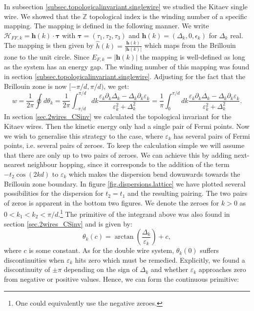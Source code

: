 In subsection \ref{subsec.topologicalinvariant.singlewire} we studied the Kitaev single wire. We showed that the $\mathbb{Z}$ topological index is the winding number of a specific mapping. The mapping is defined in the following manner. We write $\mathcal{H}_{FF,k} = \mathbf{h}(k)\cdot \boldsymbol\tau$ with $\boldsymbol\tau = (\tau_1, \tau_2, \tau_3)$ and $\mathbf{h}(k) = (\Delta_k, 0, \epsilon_k)$ for $\Delta_k$ real. The mapping is then given by $\hat{h}(k) = \frac{\mathbf{h}(k)}{|\mathbf{h}(k)|}$ which maps from the Brillouin zone to the unit circle. Since $E_{F,k} = |\mathbf{h}(k)|$ the mapping is well-defined as long as the system has an energy gap. The winding number of this mapping was found in section \ref{subsec.topologicalinvariant.singlewire}. Adjusting for the fact that the Brillouin zone is now $[-\pi/d, \pi/d)$, we get:
\begin{equation}
w = \frac{1}{2\pi}\oint d\theta_k = \frac{1}{2\pi}\int_{-\pi/d}^{\pi/d} dk \frac{\varepsilon_k\partial_k\Delta_k - \Delta_k\partial_k\varepsilon_k}{\varepsilon^2_k + \Delta^2_k} = \frac{1}{\pi}\int_{0}^{\pi/d} dk \frac{\varepsilon_k\partial_k\Delta_k - \Delta_k\partial_k\varepsilon_k}{\varepsilon^2_k + \Delta^2_k}. 
\label{eq.windingnumber.kitaevmodel}
\end{equation} 
In section \ref{sec.2wires_CSinv} we calculated the topological invariant for the Kitaev wires. Then the kinetic energy only had a single pair of Fermi points. Now we wish to generalise this strategy to the case, where $\varepsilon_k$ has several pairs of Fermi points, i.e. several pairs of zeroes. To keep the calculation simple we will assume that there are only up to two pairs of zeroes. We can achieve this by adding next-nearest neighbour hopping, since it corresponds to the addition of the term $-t_2\cos(2kd)$ to $\varepsilon_k$ which makes the dispersion bend downwards towards the Brillouin zone boundary. In figure \ref{fig.dispersions.lattice} we have plotted several possibilities for the dispersion for $t_2 = t_1$ and the resulting pairing. The two pairs of zeros is apparent in the bottom two figures. We denote the zeroes for $k > 0$ as $0 < k_1 < k_2 < \pi / d$.\footnote{One could equivalently use the negative zeroes.} The primitive of the integrand above was also found in section \ref{sec.2wires_CSinv} and is given by:
\begin{equation}
\theta_k(c) = \arctan\left(\frac{\Delta_k}{\varepsilon_k}\right) + c, \nonumber
\end{equation}
where $c$ is some constant. As for the double wire system, $\theta_k(0)$ suffers discontinuities when $\varepsilon_k$ hits zero which must be remedied. Explicitly, we found a discontinuity of $\pm \pi$ depending on the sign of $\Delta_k$ and whether $\varepsilon_k$ approaches zero from negative or positive values. Hence, we can form the continuous primitive:
